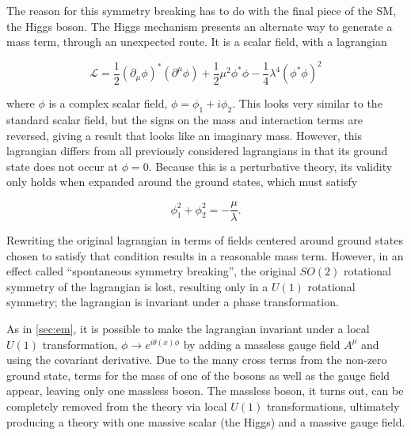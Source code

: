 The reason for this symmetry breaking has to do with the final piece of the \ac{SM}, the Higgs boson. The Higgs mechanism presents an alternate way to generate a mass term, through an unexpected route. It is a scalar field, with a lagrangian 

\begin{equation}
\mathcal{L} = \frac{1}{2}(\partial_\mu\phi)^*(\partial^\mu\phi) + \frac{1}{2}\mu^2\phi^*\phi - \frac{1}{4}\lambda^4(\phi^*\phi)^2
\end{equation}

where $\phi$ is a complex scalar field, $\phi = \phi_1 + i\phi_2$. This looks very similar to the standard scalar field, but the signs on the mass and interaction terms are reversed, giving a result that looks like an imaginary mass. However, this lagrangian differs from all previously considered lagrangians in that its ground state does not occur at $\phi = 0$. Because this is a perturbative theory, its validity only holds when expanded around the ground states, which must satisfy

\begin{equation}
\phi_1^2 + \phi_2^2 = - \frac{\mu}{\lambda} . 
\end{equation}

Rewriting the original lagrangian in terms of fields centered around ground states chosen to satisfy that condition results in a reasonable mass term. However, in an effect called ``spontaneous symmetry breaking'', the original $SO(2)$ rotational symmetry of the lagrangian is lost, resulting only in a $U(1)$ rotational symmetry; the lagrangian is invariant under a phase transformation.

As in \autoref{sec:em}, it is possible to make the lagrangian invariant under a local $U(1)$ transformation, $\phi \rightarrow e^{i\theta(x)\phi}$ by adding a massless gauge field $A^\mu$ and using the covariant derivative. Due to the many cross terms from the non-zero ground state, terms for the mass of one of the bosons as well as the gauge field appear, leaving only one massless boson. The massless boson, it turns out, can be completely removed from the theory via local $U(1)$ transformations, ultimately producing a theory with one massive scalar (the Higgs) and a massive gauge field. 




